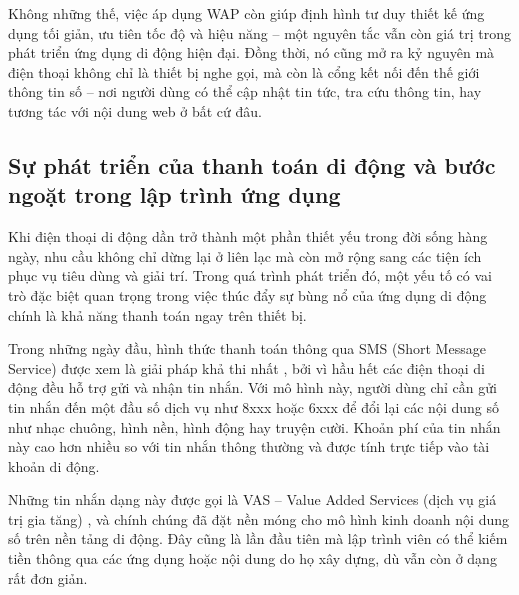   \begin{flushleft}
  \hspace*{0.8cm}Không những thế, việc áp dụng WAP còn giúp định hình tư duy thiết kế ứng dụng tối giản, ưu tiên tốc độ và hiệu năng – một nguyên tắc vẫn còn giá trị trong phát triển ứng dụng di động hiện đại. Đồng thời, nó cũng mở ra kỷ nguyên mà điện thoại không chỉ là thiết bị nghe gọi, mà còn là cổng kết nối đến thế giới thông tin số – nơi người dùng có thể cập nhật tin tức, tra cứu thông tin, hay tương tác với nội dung web ở bất cứ đâu.
  \end{flushleft}

\subsection{Sự phát triển của thanh toán di động và bước ngoặt trong lập trình ứng dụng}
\renewcommand{\labelitemi}{--}

\begin{flushleft}
\hspace*{0.8cm}Khi điện thoại di động dần trở thành một phần thiết yếu trong đời sống hàng ngày, nhu cầu không chỉ dừng lại ở liên lạc mà còn mở rộng sang các tiện ích phục vụ tiêu dùng và giải trí. Trong quá trình phát triển đó, một yếu tố có vai trò đặc biệt quan trọng trong việc thúc đẩy sự bùng nổ của ứng dụng di động chính là khả năng thanh toán ngay trên thiết bị.
\end{flushleft}

\begin{flushleft}
\hspace*{0.8cm}Trong những ngày đầu, hình thức thanh toán thông qua SMS (Short Message Service) được xem là giải pháp khả thi nhất \cite{sms-payment}, bởi vì hầu hết các điện thoại di động đều hỗ trợ gửi và nhận tin nhắn. Với mô hình này, người dùng chỉ cần gửi tin nhắn đến một đầu số dịch vụ như 8xxx hoặc 6xxx để đổi lại các nội dung số như nhạc chuông, hình nền, hình động hay truyện cười. Khoản phí của tin nhắn này cao hơn nhiều so với tin nhắn thông thường và được tính trực tiếp vào tài khoản di động.
\end{flushleft}

\begin{flushleft}
\hspace*{0.8cm}Những tin nhắn dạng này được gọi là VAS – Value Added Services (dịch vụ giá trị gia tăng) \cite{vas-overview}, và chính chúng đã đặt nền móng cho mô hình kinh doanh nội dung số trên nền tảng di động. Đây cũng là lần đầu tiên mà lập trình viên có thể kiếm tiền thông qua các ứng dụng hoặc nội dung do họ xây dựng, dù vẫn còn ở dạng rất đơn giản.
\end{flushleft}

